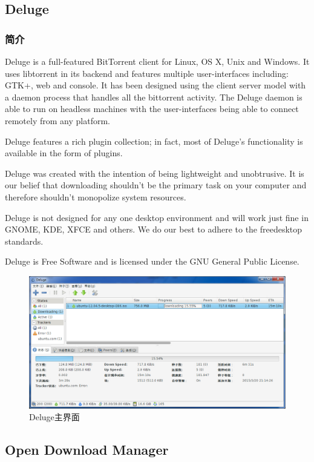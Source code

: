 \documentclass[paper=a4,fontsize=11pt]{article}
\begin{document}
	\subsection{Deluge}
	\subsubsection{简介}
	Deluge is a full-featured ​BitTorrent client for Linux, OS X, Unix and Windows. It uses ​libtorrent in its backend and features multiple user-interfaces including: GTK+, web and console. It has been designed using the client server model with a daemon process that handles all the bittorrent activity. The Deluge daemon is able to run on headless machines with the user-interfaces being able to connect remotely from any platform.
	
	Deluge features a rich plugin collection; in fact, most of Deluge's functionality is available in the form of plugins.
	
	Deluge was created with the intention of being lightweight and unobtrusive. It is our belief that downloading shouldn't be the primary task on your computer and therefore shouldn't monopolize system resources.
	
	Deluge is not designed for any one desktop environment and will work just fine in GNOME, KDE, XFCE and others. We do our best to adhere to the ​freedesktop standards.
	
	Deluge is ​Free Software and is licensed under the ​GNU General Public License.
	
	
	\begin{figure}[htbp]
		\centering
		\includegraphics[scale=0.35]{DelugeWindowsUI.jpg}
		\caption{Deluge主界面}
		\label{DelugeWindowsUI}
	\end{figure}
	
	\subsection{Open Download Manager}
	
\end{document}
